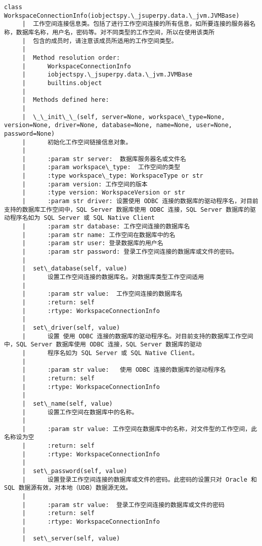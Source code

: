 \documentclass[11pt]{article}
\begin{document}
\begin{Verbatim}[commandchars=\\\{\}]
    class WorkspaceConnectionInfo(iobjectspy.\_jsuperpy.data.\_jvm.JVMBase)
     |  工作空间连接信息类。包括了进行工作空间连接的所有信息，如所要连接的服务器名称，数据库名称，用户名，密码等。对不同类型的工作空间，所以在使用该类所
     |  包含的成员时，请注意该成员所适用的工作空间类型。
     |  
     |  Method resolution order:
     |      WorkspaceConnectionInfo
     |      iobjectspy.\_jsuperpy.data.\_jvm.JVMBase
     |      builtins.object
     |  
     |  Methods defined here:
     |  
     |  \_\_init\_\_(self, server=None, workspace\_type=None, version=None, driver=None, database=None, name=None, user=None, password=None)
     |      初始化工作空间链接信息对象。
     |      
     |      :param str server:  数据库服务器名或文件名
     |      :param workspace\_type:  工作空间的类型
     |      :type workspace\_type: WorkspaceType or str
     |      :param version: 工作空间的版本
     |      :type version: WorkspaceVersion or str
     |      :param str driver: 设置使用 ODBC 连接的数据库的驱动程序名，对目前支持的数据库工作空间中，SQL Server 数据库使用 ODBC 连接，SQL Server 数据库的驱动程序名如为 SQL Server 或 SQL Native Client
     |      :param str database: 工作空间连接的数据库名
     |      :param str name: 工作空间在数据库中的名
     |      :param str user: 登录数据库的用户名
     |      :param str password: 登录工作空间连接的数据库或文件的密码。
     |  
     |  set\_database(self, value)
     |      设置工作空间连接的数据库名。对数据库类型工作空间适用
     |      
     |      :param str value:  工作空间连接的数据库名
     |      :return: self
     |      :rtype: WorkspaceConnectionInfo
     |  
     |  set\_driver(self, value)
     |      设置 使用 ODBC 连接的数据库的驱动程序名。对目前支持的数据库工作空间中，SQL Server 数据库使用 ODBC 连接，SQL Server 数据库的驱动
     |      程序名如为 SQL Server 或 SQL Native Client。
     |      
     |      :param str value:   使用 ODBC 连接的数据库的驱动程序名
     |      :return: self
     |      :rtype: WorkspaceConnectionInfo
     |  
     |  set\_name(self, value)
     |      设置工作空间在数据库中的名称。
     |      
     |      :param str value: 工作空间在数据库中的名称，对文件型的工作空间，此名称设为空
     |      :return: self
     |      :rtype: WorkspaceConnectionInfo
     |  
     |  set\_password(self, value)
     |      设置登录工作空间连接的数据库或文件的密码。此密码的设置只对 Oracle 和 SQL 数据源有效，对本地（UDB）数据源无效。
     |      
     |      :param str value:  登录工作空间连接的数据库或文件的密码
     |      :return: self
     |      :rtype: WorkspaceConnectionInfo
     |  
     |  set\_server(self, value)

\end{Verbatim}
\end{document}
